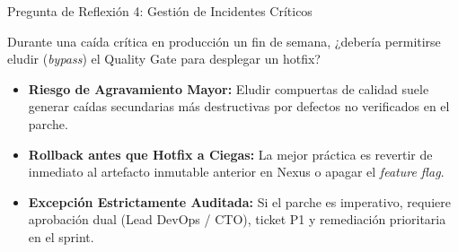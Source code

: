 \documentclass[aspectratio=169]{beamer}
\begin{document}
\begin{frame}{Pregunta de Reflexión 4: Gestión de Incidentes Críticos}
  \begin{tcolorbox}[colback=cbBlue!8,colframe=cbBlue,arc=4pt,title=\textbf{Pregunta 4: Bypass de Quality Gate en Incidentes P1},coltitle=cbWhite,fonttitle=\bfseries\small,top=4pt,bottom=4pt,left=6pt,right=6pt]
    \small Durante una caída crítica en producción un fin de semana, ¿debería permitirse eludir (\textit{bypass}) el Quality Gate para desplegar un hotfix?
  \end{tcolorbox}
  \vspace{0.2cm}
  \pause
  \begin{tcolorbox}[colback=cbGreen!10,colframe=cbGreen,arc=4pt,title=\textbf{Análisis y Respuesta de Ingeniería},coltitle=cbWhite,fonttitle=\bfseries\small,top=4pt,bottom=4pt,left=6pt,right=6pt]
    \footnotesize
    \begin{itemize}
      \setlength{\itemsep}{1.5pt}
      \item \textbf{Riesgo de Agravamiento Mayor:} Eludir compuertas de calidad suele generar caídas secundarias más destructivas por defectos no verificados en el parche.
      \item \textbf{Rollback antes que Hotfix a Ciegas:} La mejor práctica es revertir de inmediato al artefacto inmutable anterior en Nexus o apagar el \textit{feature flag}.
      \item \textbf{Excepción Estrictamente Auditada:} Si el parche es imperativo, requiere aprobación dual (Lead DevOps / CTO), ticket P1 y remediación prioritaria en el sprint.
    \end{itemize}
  \end{tcolorbox}
\end{frame}
\end{document}
